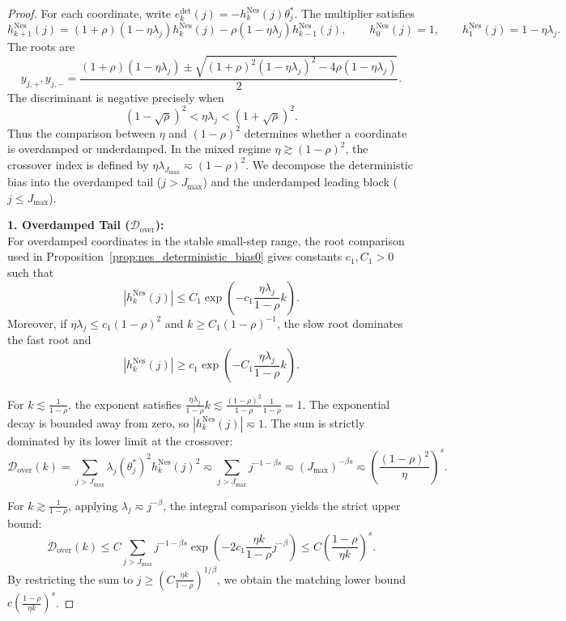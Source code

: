 \begin{proof}
For each coordinate, write \(e_k^{\mathrm{det}}(j)=-h_k^{\mathrm{Nes}}(j)\theta_j^*\). The multiplier satisfies
\[
    h_{k+1}^{\mathrm{Nes}}(j)
    =
    (1+\rho)(1-\eta\lambda_j)h_k^{\mathrm{Nes}}(j)
    -\rho(1-\eta\lambda_j)h_{k-1}^{\mathrm{Nes}}(j),
    \qquad
    h_0^{\mathrm{Nes}}(j)=1,
    \qquad
    h_1^{\mathrm{Nes}}(j)=1-\eta\lambda_j.
\]
The roots are
\[
    y_{j,+},y_{j,-}
    =
    \frac{(1+\rho)(1-\eta\lambda_j)
    \pm
    \sqrt{(1+\rho)^2(1-\eta\lambda_j)^2-4\rho(1-\eta\lambda_j)}}{2}.
\]
The discriminant is negative precisely when
\[
    (1-\sqrt\rho)^2<\eta\lambda_j<(1+\sqrt\rho)^2.
\]
Thus the comparison between $\eta$ and $(1-\rho)^2$ determines whether a coordinate is overdamped or underdamped. In the mixed regime $\eta \gtrsim (1-\rho)^2$, the crossover index is defined by $\eta\lambda_{J_{\max}} \eqsim (1-\rho)^2$. We decompose the deterministic bias into the overdamped tail ($j > J_{\max}$) and the underdamped leading block ($j \le J_{\max}$).

\textbf{1. Overdamped Tail ($\mathcal{D}_{\mathrm{over}}$):} \\
For overdamped coordinates in the stable small-step range, the root comparison used in Proposition~\ref{prop:nes_deterministic_bias0} gives constants $c_1,C_1>0$ such that
\begin{equation*}
    |h_k^{\mathrm{Nes}}(j)|
    \le
    C_1\exp\left(-c_1\frac{\eta\lambda_j}{1-\rho}k\right).
\end{equation*}
Moreover, if $\eta\lambda_j\le c_1(1-\rho)^2$ and $k\ge C_1(1-\rho)^{-1}$, the slow root dominates the fast root and
\begin{equation*}
    |h_k^{\mathrm{Nes}}(j)|
    \ge
    c_1\exp\left(-C_1\frac{\eta\lambda_j}{1-\rho}k\right).
\end{equation*}

For $k \lesssim \frac{1}{1-\rho}$, the exponent satisfies $\frac{\eta\lambda_j}{1-\rho}k \lesssim \frac{(1-\rho)^2}{1-\rho}\frac{1}{1-\rho} = 1$. The exponential decay is bounded away from zero, so $|h_k^{\mathrm{Nes}}(j)| \eqsim 1$. The sum is strictly dominated by its lower limit at the crossover:
\[
    \mathcal D_{\mathrm{over}}(k) = \sum_{j > J_{\max}} \lambda_j(\theta_j^*)^2 h_k^{\mathrm{Nes}}(j)^2 \eqsim \sum_{j > J_{\max}} j^{-1-\beta s} \eqsim (J_{\max})^{-\beta s} \eqsim \left(\frac{(1-\rho)^2}{\eta}\right)^s.
\]

For $k \gtrsim \frac{1}{1-\rho}$, applying $\lambda_j\eqsim j^{-\beta}$, the integral comparison yields the strict upper bound:
\begin{equation*}
    \mathcal D_{\mathrm{over}}(k)
    \le
    C\sum_{j > J_{\max}}j^{-1-\beta s}
    \exp\left(-2c_1\frac{\eta k}{1-\rho}j^{-\beta}\right)
    \le
    C\left(\frac{1-\rho}{\eta k}\right)^s .
\end{equation*}
By restricting the sum to $j \ge (C\frac{\eta k}{1-\rho})^{1/\beta}$, we obtain the matching lower bound $c\left(\frac{1-\rho}{\eta k}\right)^s$.


\end{proof}
